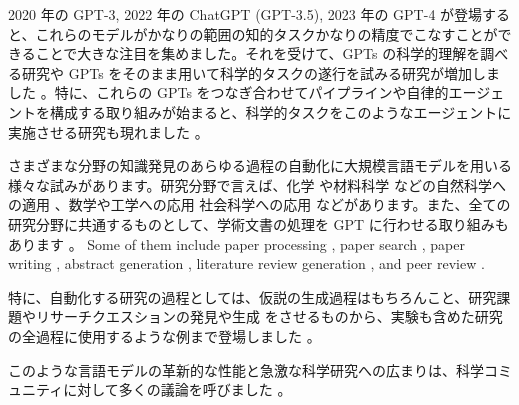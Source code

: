 2020 年の GPT-3, 2022 年の ChatGPT (GPT-3.5), 2023 年の GPT-4 が登場すると、これらのモデルがかなりの範囲の知的タスクかなりの精度でこなすことができることで大きな注目を集めました。それを受けて、GPTs の科学的理解を調べる研究や GPTs をそのまま用いて科学的タスクの遂行を試みる研究が増加しました \cite{bordt2023chatgpt,white2022large}。特に、これらの GPTs をつなぎ合わせてパイプラインや自律的エージェントを構成する取り組みが始まると、科学的タスクをこのようなエージェントに実施させる研究も現れました \cite{wang2023survey}。


さまざまな分野の知識発見のあらゆる過程の自動化に大規模言語モデルを用いる様々な試みがあります。研究分野で言えば、化学 \cite{bran2023chemcrow,jablonka202314,white2022large,hatakeyama2023prompt,jablonka202314,guo2023can} や材料科学 \cite{jablonka202314,jablonka202314,xie2023large,kang2023chatmof,merchant2023scaling} などの自然科学への適用 \cite{ai4science2023impact,bran2023chemcrow,white2022large,hatakeyama2023prompt,jablonka202314,guo2023can,boiko2023emergent,charness2023generation,qin2023gpt,zheng2023large,qian2023can,wysocka2023large,lee2023benefits,nori2023capabilities,wang2023large,singhal2023large,yang2022gatortron,deng2023learning,merchant2023scaling}、数学や工学への応用 \cite{wu2023empirical,pursnani2023performance,zheng2023can,zhang2023automl}
社会科学への応用 \cite{wang2023survey,bail2023can,ziems2023can,park2023generative,horton2023large,koneru2023can} などがあります。また、全ての研究分野に共通するものとして、学術文書の処理を GPT に行わせる取り組みもあります \cite{alzaabi2023chatgpt}。 Some of them include paper processing \cite{elicit,scispace,van2023chatgpt}, paper search \cite{elicit,scispace}, paper writing \cite{transformer2022can}, abstract generation \cite{gao2023comparing}, literature review generation \cite{aydin2022openai}, and peer review \cite{wexin2023can,liu2023reviewergpt,robertson2023gpt4,hosseini2023fighting}. 

特に、自動化する研究の過程としては、仮説の生成過程はもちろんこと、研究課題やリサーチクエスションの発見や生成 \cite{oppenlaender2023mapping,lahat2023evaluating} をさせるものから、実験も含めた研究の全過程に使用するような例まで登場しました \cite{boiko2023emergent,charness2023generation,qin2023gpt}。

このような言語モデルの革新的な性能と急激な科学研究への広まりは、科学コミュニティに対して多くの議論を呼びました \cite{birhane2023science}。

